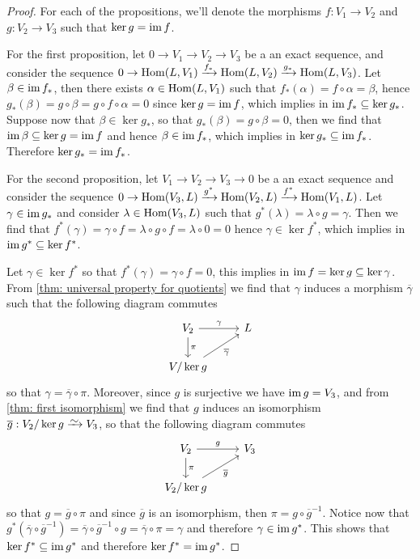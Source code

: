 \begin{proof}
  For each of the propositions, we'll denote the morphisms \(f: V_1 \to V_2\)
  and  \(g: V_2 \to V_3\) such that \(\ker g = \operatorname{im} f\).

  For the first proposition, let \(0 \to V_1 \to V_2 \to V_3\) be a an exact
  sequence, and consider the sequence \(0 \to \operatorname{Hom}(L, V_1) \xrightarrow{f_*}
  \operatorname{Hom}(L, V_2) \xrightarrow{g_*} \operatorname{Hom}(L, V_3)\). Let \(\beta \in \operatorname{im} f_*\), then
  there exists \(\alpha \in \operatorname{Hom}(L, V_1)\) such that \(f_*(\alpha) = f \circ
  \alpha = \beta\), hence \(g_*(\beta) = g \circ \beta = g \circ f \circ \alpha
  = 0\) since \(\ker g = \operatorname{im} f\), which implies in \(\operatorname{im} f_* \subseteq \ker
  g_*\).  Suppose now that \(\beta \in \ker g_*\), so that \(g_*(\beta) = g
  \circ \beta = 0\), then we find that \(\operatorname{im} \beta \subseteq \ker g = \operatorname{im} f\)
  and hence \(\beta \in \operatorname{im} f_*\), which implies in \(\ker g_* \subseteq \operatorname{im}
  f_*\).  Therefore \(\ker g_* = \operatorname{im} f_*\).

  For the second proposition, let \(V_1 \to V_2 \to V_3 \to 0\) be a an exact
  sequence and consider the sequence \(0 \to \operatorname{Hom}(V_3, L) \xrightarrow{g^*}
  \operatorname{Hom}(V_2, L) \xrightarrow{f^*} \operatorname{Hom}(V_1, L)\). Let \(\gamma \in \operatorname{im} g_*\) and
  consider \(\lambda \in \operatorname{Hom}(V_3, L)\) such that \(g^*(\lambda) = \lambda \circ
  g = \gamma\). Then we find that \(f^*(\gamma) = \gamma \circ f = \lambda \circ
  g \circ f = \lambda \circ 0 = 0\) hence \(\gamma \in \ker f^*\), which implies
  in \(\operatorname{im} g^* \subseteq \ker f^*\).

  Let \(\gamma \in \ker f^*\) so that \(f^*(\gamma) = \gamma \circ f = 0\), this
  implies in \(\operatorname{im} f = \ker g \subseteq \ker \gamma\). From \cref{thm: universal
  property for quotients} we find that \(\gamma\) induces a morphism
  \(\overline\gamma\) such that the following diagram commutes
  \[
    \begin{tikzcd}
      V_2 \ar[r, "\gamma"] \ar[d, "\pi"] &L \\
      V/\ker g \ar[ur, swap, "\overline\gamma"]
    \end{tikzcd}
  \]
  so that \(\gamma = \overline\gamma \circ \pi\). Moreover, since \(g\) is
  surjective we have \(\operatorname{im} g = V_3\), and from \cref{thm: first isomorphism} we
  find that \(g\) induces an isomorphism \(\overline g: V_2/\ker g \isoto
  V_3\), so that the following diagram commutes
  \[
    \begin{tikzcd}
      V_2 \ar[r, "g"] \ar[d, "\pi"] &V_3 \\
      V_2/\ker g \ar[ru, swap, "\overline g"]
    \end{tikzcd}
  \]
  so that \(g = \overline g \circ \pi\) and since \(\overline g\) is an
  isomorphism, then \(\pi = g \circ \overline g^{-1}\). Notice now that
  \(g^*(\overline \gamma \circ \overline g^{-1}) = \overline\gamma \circ
  \overline g^{-1} \circ g = \overline\gamma \circ \pi = \gamma\) and therefore
  \(\gamma \in \operatorname{im} g^*\). This shows that \(\ker f^* \subseteq \operatorname{im} g^*\) and
  therefore \(\ker f^* = \operatorname{im} g^*\).
\end{proof}
